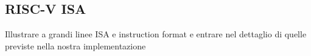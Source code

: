 \subsection{RISC-V ISA}
Illustrare a grandi linee ISA e instruction format e entrare nel dettaglio di quelle previste nella nostra implementazione
